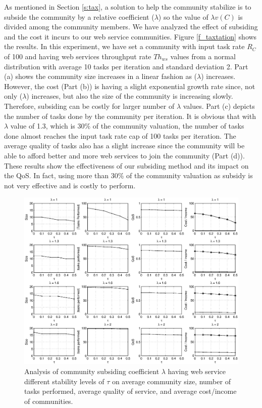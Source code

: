 \documentclass[10pt,journal,cspaper,compsoc]{IEEEtran}
\begin{document}
As mentioned in Section \ref{s:tax}, a solution to help the
community stabilize is to subside the community by a relative
coefficient ($\lambda$) so the value of $\lambda v(C)$ is divided
among the community members. We have analyzed the effect of
subsiding and the cost it incurs to our web service communities.
Figure \ref{f_taxtation} shows the results. In this experiment, we
have set a community with input task rate $R_C$ of 100 and having
web services throughput rate $Th_{ws}$ values from a normal
distribution with average 10 tasks per iteration and standard
deviation 2. Part (a) shows the community size increases in a
linear fashion as ($\lambda$) increases. However, the cost (Part
(b)) is having a slight exponential growth rate since, not only
($\lambda$) increases, but also the size of the community is
increasing slowly. Therefore, subsiding can be costly for larger
number of $\lambda$ values. Part (c) depicts the number of tasks
done by the community per iteration. It is obvious that with
$\lambda$ value of 1.3, which is 30\% of the community valuation,
the number of tasks done almost reaches the input task rate cap of
100 tasks per iteration. The average quality of tasks also has a
slight increase since the community will be able to afford better
and more web services to join the community (Part (d)). These
results show the effectiveness of our subsiding method and its
impact on the QoS. In fact, using more than 30\% of the community
valuation as subsidy is not very effective and is costly to
perform.

\begin{figure}[!t]
\centerline{\includegraphics[width=6.75in]{tax_dyn.eps}}
\caption{Analysis of community subsiding coefficient $\lambda$
having web service different stability levels of $\tau$ on average
community size, number of tasks performed, average quality of
service, and average cost/income of communities.}
\label{fig_dynamic_taxtation}
\end{figure}
\end{document}
